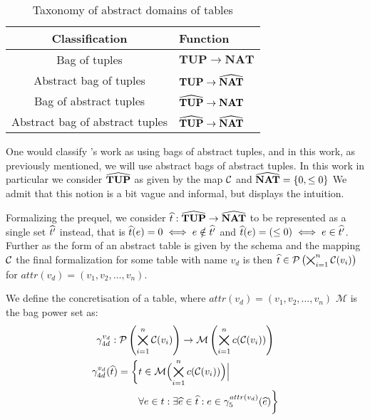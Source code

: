 \begin{table}
    \caption{Taxonomy of abstract domains of tables}
    \centering
    \begin{tabular}{c|l}
    Classification & Function \\
    \hline
    \hline
        Bag of tuples & $\mathbf{TUP} \rightarrow \mathbf{NAT}$ \\
        Abstract bag of tuples & $\mathbf{TUP} \rightarrow \widehat{\mathbf{NAT}}$ \\
        Bag of abstract tuples & $\widehat{\mathbf{TUP}} \rightarrow \mathbf{NAT}$ \\
        Abstract bag of abstract tuples & $\widehat{\mathbf{TUP}} \rightarrow \widehat{\mathbf{NAT}}$ \\
    \end{tabular}
    \label{tab:taxonomy_of_abstract_domain_of_tables}
\end{table}

One would classify \cite{halder_abstract_2012}'s work as using bags of abstract tuples, and in this work, as previously mentioned, we will use abstract bags of abstract tuples.
In this work in particular we consider $\widehat{\mathbf{TUP}}$ as given by the map $\mathcal{C}$ and $\widehat{\mathbf{NAT}} = \{0, \leq0\}$
We admit that this notion is a bit vague and informal, but displays the intuition.

Formalizing the prequel, we consider $\widehat{t} : \widehat{\mathbf{TUP}} \rightarrow \widehat{\mathbf{NAT}}$ to be represented as a single set $\widehat{t'}$ instead, that is $\widehat{t}({e}) = 0 \iff e \notin \widehat{t'}$ and  $\widehat{t}({e}) = (\leq 0) \iff e \in \widehat{t'}$.
Further as the form of an abstract table is given by the schema and the mapping $\mathcal{C}$ the final formalization for some table with name $v_d$ is then $\widehat{t} \in \mathcal{P}\left(\bigtimes_{i = 1}^{n}\mathcal{C}(v_i)\right)$ for $attr(v_d) = (v_1, v_2, \dots, v_n)$.

We define the concretisation of a table, where $attr(v_d) = (v_1, v_2, \dots, v_n)$ $\mathcal{M}$ is the bag power set as:
\begin{gather}
    \gamma^{v_d}_{4d} : \mathcal{P}\left(\bigtimes_{i = 1}^{n}\mathcal{C}(v_i)\right) \rightarrow \mathcal{M}\left(\bigtimes_{i = 1}^n c(\mathcal{C}(v_i))\right)\\
    \begin{split}
        \gamma^{v_d}_{4d}(\widehat{t}) = \biggl\{ &t \in \mathcal{M}\Bigl(\bigtimes_{i = 1}^n c(\mathcal{C}(v_i))\Bigr) \Big|\\
        &\forall e \in t : \exists \widehat{e} \in \widehat{t} : e \in \gamma^{attr(v_d)}_5(\widehat{e}) \biggr\}
    \end{split}
\end{gather}

